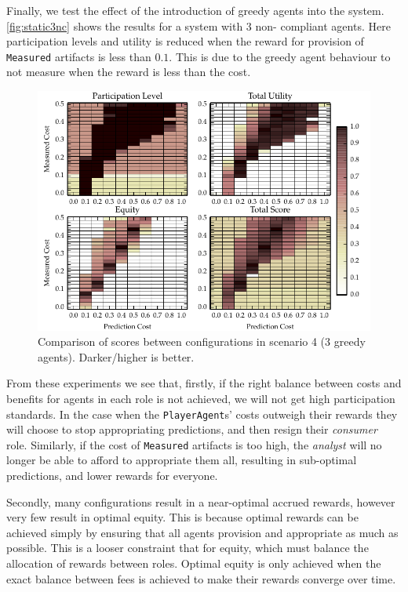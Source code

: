 Finally, we test the effect of the introduction of greedy agents into
the system. \autoref{fig:static3nc} shows the results for a system with 3 non-
compliant agents. Here participation levels and utility is reduced when the
reward for provision of \texttt{Measured} artifacts is less than $0.1$. This is
due to the greedy agent behaviour to not measure when the reward is
less than the cost.

\begin{figure}
\includegraphics{gfx/kc/static_1_3nc.pdf} 
\caption[Comparison of scores between configurations in scenario 4 (3 greedy agents).]{Comparison of scores between configurations in scenario 4 (3 greedy agents). Darker/higher is better.}\label{fig:static3nc}
\end{figure}

From these experiments we see that, firstly, if the right balance between
costs and benefits for agents in each role is not achieved, we will not get
high participation standards. In the case when the \texttt{PlayerAgent}s' costs
outweigh their rewards they will choose to stop appropriating predictions, and
then resign their \emph{consumer} role. Similarly, if the cost of
\texttt{Measured} artifacts is too high, the \emph{analyst} will no longer be
able to afford to appropriate them all, resulting in sub-optimal
predictions, and lower rewards for everyone.

Secondly, many configurations result in a near-optimal accrued rewards, however very
few result in optimal equity. This is because optimal rewards can be achieved
simply by ensuring that all agents provision and appropriate as much as
possible. This is a looser constraint that for equity, which must balance the
allocation of rewards between roles. Optimal equity is only achieved when
the exact balance between fees is achieved to make their rewards converge
over time.

